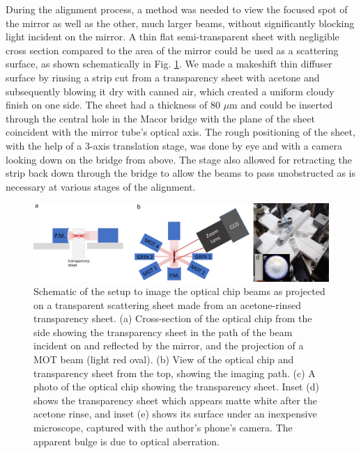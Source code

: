 During the alignment process, a method was needed to view the focused spot of the mirror as well as the other, much larger beams, without significantly blocking light incident on the mirror. A thin flat semi-transparent sheet with negligible cross section compared to the area of the mirror could be used as a scattering surface, as shown schematically in Fig. \ref{fig:scattering_sheet_method}. We made a makeshift thin diffuser surface by rinsing a strip cut from a transparency sheet with acetone and subsequently blowing it dry with canned air, which created a uniform cloudy finish on one side. The sheet had a thickness of 80 $\mu \mathrm{m}$ and could be inserted through the central hole in the Macor bridge with the plane of the sheet coincident with the mirror tube’s optical axis. The rough positioning of the sheet, with the help of a 3-axis translation stage, was done by eye and with a camera looking down on the bridge from above. The stage also allowed for retracting the strip back down through the bridge to allow the beams to pass unobstructed as is necessary at various stages of the alignment.

\begin{figure}[t!]
    \centering
    \includegraphics[width=\textwidth]{Images/beam_projection_imaging_schematic.pdf}
    \caption{Schematic of the setup to image the optical chip beams as projected on a transparent scattering sheet made from an acetone-rinsed transparency sheet.  (a) Cross-section of the optical chip from the side showing the transparency sheet in the path of the beam incident on and reflected by the mirror, and the projection of a MOT beam (light red oval). (b) View of the optical chip and transparency sheet from the top, showing the imaging path. (c) A photo of the optical chip showing the transparency sheet. Inset (d) shows the transparency sheet which appears matte white after the acetone rinse, and inset (e) shows its surface under an inexpensive microscope, captured with the author's phone's camera. The apparent bulge is due to optical aberration.}
    \label{fig:scattering_sheet_method}
\end{figure}

